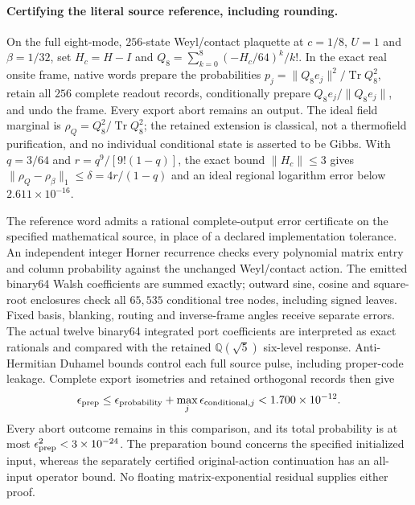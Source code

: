 \paragraph{Certifying the literal source reference, including rounding.}
On the full eight-mode, $256$-state Weyl/contact plaquette at $c=1/8$,
$U=1$ and $\beta=1/32$, set $H_c=H-I$ and
$Q_8=\sum_{k=0}^8(-H_c/64)^k/k!$. In the exact real onsite frame,
native words prepare the probabilities
$p_j=\|Q_8e_j\|^2/\operatorname{Tr}Q_8^2$, retain all $256$ complete
readout records, conditionally prepare $Q_8e_j/\|Q_8e_j\|$, and undo
the frame. Every export abort remains an output. The ideal field marginal
is $\rho_Q=Q_8^2/\operatorname{Tr}Q_8^2$; the retained extension is
classical, not a thermofield purification, and no individual conditional
state is asserted to be Gibbs. With $q=3/64$ and
$r=q^9/[9!(1-q)]$, the exact bound $\|H_c\|\leq3$ gives
$\|\rho_Q-\rho_\beta\|_1\leq\delta=4r/(1-q)$ and an ideal
regional logarithm error below $2.611\times10^{-16}$.

The reference word admits a rational complete-output
error certificate on the specified mathematical source, in place of a
declared implementation tolerance.
An independent integer Horner recurrence checks every polynomial matrix
entry and column probability against the unchanged Weyl/contact action.
The emitted binary64 Walsh coefficients are summed exactly; outward
sine, cosine and square-root enclosures check all $65{,}535$ conditional
tree nodes, including signed leaves. Fixed basis, blanking, routing and
inverse-frame angles receive separate errors. The actual twelve binary64
integrated port coefficients are interpreted as exact rationals and
compared with the retained $\mathbb Q(\sqrt5)$ six-level response.
Anti-Hermitian Duhamel bounds control each full source pulse, including
proper-code leakage. Complete export isometries and retained orthogonal
records then give
\[
 \epsilon_{\rm prep}\leq\epsilon_{\rm probability}
       +\max_j\epsilon_{{\rm conditional},j}
       <1.700\times10^{-12}.
\]
Every abort outcome remains in this comparison, and its total probability
is at most $\epsilon_{\rm prep}^2<3\times10^{-24}$. The preparation
bound concerns the specified initialized input, whereas the separately
certified original-action continuation has an all-input operator bound.
No floating matrix-exponential residual supplies either proof.

